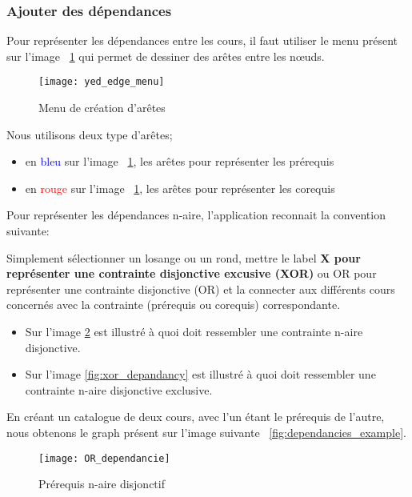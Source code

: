 \subsubsection{Ajouter des dépendances}

Pour représenter les dépendances entre les cours, il faut utiliser le menu présent sur l'image  ~\ref{fig:yed_edge_menu} qui permet de dessiner des arêtes entre les nœuds.

\begin{figure}[htb]
\centering
\caption{Menu de création d’arêtes}
\label{fig:yed_edge_menu}
\texttt{[image: yed\_edge\_menu]}
\end{figure}

Nous utilisons deux type d'arêtes;

\begin{itemize}
\item en \textcolor{blue}{bleu} sur l'image ~\ref{fig:yed_edge_menu}, les arêtes pour représenter les prérequis
\item en \textcolor{red}{rouge} sur l'image ~\ref{fig:yed_edge_menu}, les arêtes pour représenter les corequis
\end{itemize}

Pour représenter les dépendances n-aire, l'application reconnait la convention suivante:

Simplement sélectionner un losange ou un rond, mettre le label \textbf{X pour représenter une contrainte disjonctive excusive (XOR)} ou {OR pour représenter une contrainte disjonctive (OR)} et la connecter aux différents cours concernés avec la contrainte (prérequis ou corequis) correspondante.

\begin{itemize}
\item Sur l'image \ref{fig:or_depandancy} est illustré à quoi doit ressembler une contrainte n-aire disjonctive.
\item Sur l'image \ref{fig:xor_depandancy} est illustré à quoi doit ressembler une contrainte n-aire disjonctive exclusive.
\end{itemize}

En créant un catalogue de deux cours, avec l'un étant le prérequis de l'autre, nous obtenons le graph présent sur l'image suivante ~\ref{fig:dependancies_example}.

\begin{figure}[htb]
\centering
\caption{Prérequis n-aire disjonctif}
\label{fig:or_depandancy}
\texttt{[image: OR\_dependancie]}
\end{figure}

